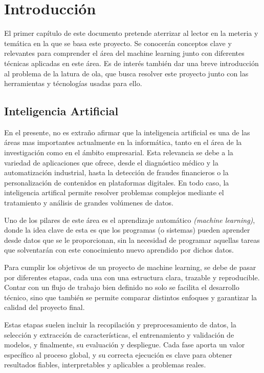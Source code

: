 \chapter{Introducción}
\label{ch:introduccion}


\indent El primer capítulo de este documento pretende aterrizar al lector en la meteria y temática en la que se basa este proyecto. Se conocerán conceptos clave y relevantes para comprender el área del machine learning junto con diferentes técnicas aplicadas en este área. Es de interés también dar una breve introducción al problema de la latura de ola, que busca resolver este proyecto junto con las herramientas y técnologías usadas para ello.\vspace{1em}

\section{Inteligencia Artificial}
\indent En el presente, no es extraño afirmar que la inteligencia artificial es una de las áreas mas importantes actualmente en la informática, tanto en el área de la investigación como en el ámbito empresarial. Esta relevancia se debe a la variedad de aplicaciones que ofrece, desde el diagnóstico médico y la automatización industrial, hasta la detección de fraudes financieros o la personalización de contenidos en plataformas digitales. En todo caso, la inteligencia artifical permite resolver problemas complejos mediante el tratamiento y análisis de grandes volúmenes de datos.

\indent Uno de los pilares de este área es el aprendizaje automático \textit{(machine learning)}, donde la idea clave de esta es que los programas (o sistemas) pueden aprender desde datos que se le proporcionan, sin la necesidad de programar aquellas tareas que solventarán con este conocimiento nuevo aprendido por dichos datos.\vspace{1em}

\indent Para cumplir los objetivos de un proyecto de machine learning, se debe de pasar por diferentes etapas, cada una con una estructura clara, trazable y reproducible. Contar con un flujo de trabajo bien definido no solo se facilita el desarrollo técnico, sino que también se permite comparar distintos enfoques y garantizar la calidad del proyecto final.

\indent Estas etapas suelen incluir la recopilación y preprocesamiento de datos, la selección y extracción de características, el entrenamiento y validación de modelos, y finalmente, su evaluación y despliegue. Cada fase aporta un valor específico al proceso global, y su correcta ejecución es clave para obtener resultados fiables, interpretables y aplicables a problemas reales.\vspace{1em}

